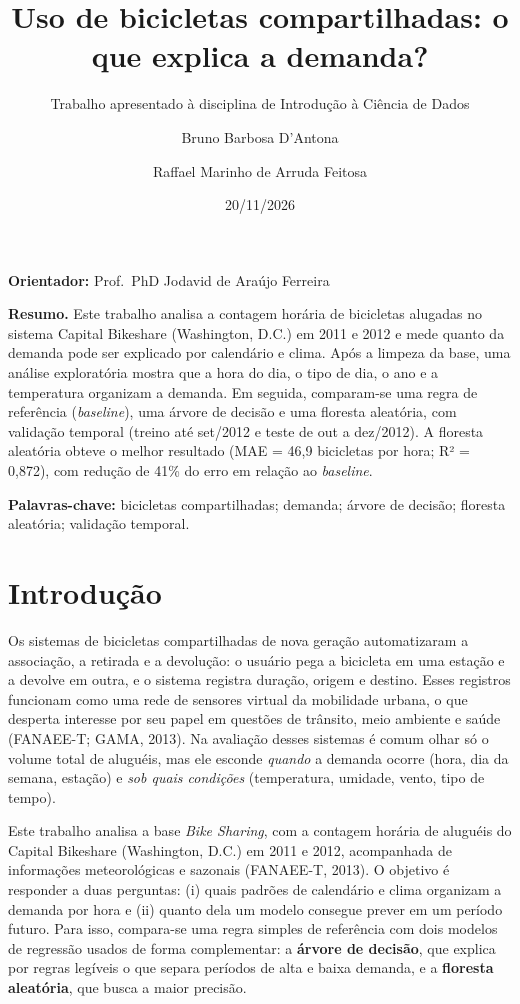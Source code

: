 \documentclass[
  portuguese,
  10pt,
  a4paper,
]{article}
\title{Uso de bicicletas compartilhadas: o que explica a demanda?}
\subtitle{Trabalho apresentado à disciplina de Introdução à Ciência de
Dados}
\author{Bruno Barbosa D'Antona \and Raffael Marinho de Arruda Feitosa}
\date{20/11/2026}
\begin{document}
\maketitle


\textbf{Orientador:} Prof.~PhD Jodavid de Araújo Ferreira

\textbf{Resumo.} Este trabalho analisa a contagem horária de bicicletas
alugadas no sistema Capital Bikeshare (Washington, D.C.) em 2011 e 2012
e mede quanto da demanda pode ser explicado por calendário e clima. Após
a limpeza da base, uma análise exploratória mostra que a hora do dia, o
tipo de dia, o ano e a temperatura organizam a demanda. Em seguida,
comparam-se uma regra de referência (\emph{baseline}), uma árvore de
decisão e uma floresta aleatória, com validação temporal (treino até
set/2012 e teste de out a dez/2012). A floresta aleatória obteve o
melhor resultado (MAE = 46,9 bicicletas por hora; R² = 0,872), com
redução de 41\% do erro em relação ao \emph{baseline}.

\textbf{Palavras-chave:} bicicletas compartilhadas; demanda; árvore de
decisão; floresta aleatória; validação temporal.

\section{Introdução}\label{introduuxe7uxe3o}

Os sistemas de bicicletas compartilhadas de nova geração automatizaram a
associação, a retirada e a devolução: o usuário pega a bicicleta em uma
estação e a devolve em outra, e o sistema registra duração, origem e
destino. Esses registros funcionam como uma rede de sensores virtual da
mobilidade urbana, o que desperta interesse por seu papel em questões de
trânsito, meio ambiente e saúde (FANAEE-T; GAMA, 2013). Na avaliação
desses sistemas é comum olhar só o volume total de aluguéis, mas ele
esconde \emph{quando} a demanda ocorre (hora, dia da semana, estação) e
\emph{sob quais condições} (temperatura, umidade, vento, tipo de tempo).

Este trabalho analisa a base \emph{Bike Sharing}, com a contagem horária
de aluguéis do Capital Bikeshare (Washington, D.C.) em 2011 e 2012,
acompanhada de informações meteorológicas e sazonais (FANAEE-T, 2013). O
objetivo é responder a duas perguntas: (i) quais padrões de calendário e
clima organizam a demanda por hora e (ii) quanto dela um modelo consegue
prever em um período futuro. Para isso, compara-se uma regra simples de
referência com dois modelos de regressão usados de forma complementar: a
\textbf{árvore de decisão}, que explica por regras legíveis o que separa
períodos de alta e baixa demanda, e a \textbf{floresta aleatória}, que
busca a maior precisão.
\end{document}
